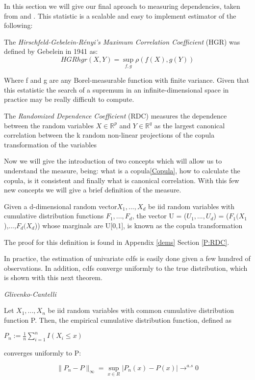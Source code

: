 In this section we will give our final aproach to measuring dependencies, taken from \cite{RDC1} and \cite{RDC2}. This statistic is a scalable and easy to implement estimator of the following:

\begin{defn}\label{RDC:DEFN}

The \textit{Hirschfeld-Gebelein-Rényi’s Maximum Correlation
Coefficient} (HGR) was defined by Gebelein in 1941 \cite{HGR_text} as:
\begin{equation}{HGR}
hgr(X,Y) = \sup_{f,g}\rho(f(X),g(Y))
\end{equation}

Where f and g are any Borel-measurable function with finite variance. Given that this estatistic the search of a supremum in an infinite-dimensional space in practice may be really difficult to compute. 

The \textit{Randomized Dependence Coefficient} (RDC) measures the dependence between the random variables $X\in\mathbb{R}^{p}$ and $Y\in\mathbb{R}^{q}$ as the largest canonical correlation  between the k random non-linear projections of the copula transformation of the variables
\end{defn}

Now we will give the introduction of two concepts which will allow us to understand the measure, being: what is a copula\ref{Copula}, how to calculate the copula, is it consistent and finally what is canonical correlation. With this few new concepts we will give a brief definition of the measure.

\begin{defn}[Copula]
Given a d-dimensional random vector$X_{1} , . . . , X_{d}$  be iid random variables with cumulative distribution functions $F_{1} , . . . , F_{d}$, the vector U = ($U_{1},...,U_{d}$) = ($F_{1}(X_{1}$),...,$F_{d}(X_{d}$))
whose marginals are U[0,1], is known as the copula transformation
\end{defn}

The proof for this definition is found in Appendix \ref{dems} Section \ref{P:RDC}. 


In practice, the estimation of univariate cdfs is easily done given a few hundred of observations. In addition, cdfs converge uniformly to the true distribution, which is shown with this next theorem.

\begin{thm}
\textit{Glivenko-Cantelli}

Let $X_{1},...,X_{n}$ be iid random variables with common cumulative distribution function P. Then, the empirical cumulative distribution function, defined as

$P_{n} := \frac{1}{n} \sum_{i=1}^{n} \textit{I}(X_{i} \leq x)$

converges uniformly to P:

$$\|P_{n} - P\|_{\infty}= \sup_{x \in R}|P_{n}(x) - P(x)| \rightarrow^{a.s} 0 $$

\end{thm}

